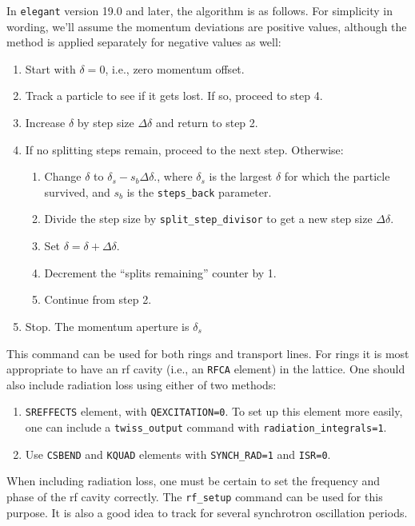 \documentclass[11pt]{article}
\begin{document}
In {\tt elegant} version 19.0 and later, the algorithm is as follows.  For simplicity in
wording, we'll assume the momentum deviations are positive values,
although the method is applied separately for negative values as well:
\begin{enumerate}
\item Start with $\delta=0$, i.e., zero momentum offset.
\item Track a particle to see if it gets lost.  If so, proceed to step 4.
\item Increase $\delta$ by step size $\Delta\delta$ and return to step 2.
\item If no splitting steps remain, proceed to the next step.  Otherwise:
\begin{enumerate}
\item Change $\delta$ to $\delta_s - s_b\Delta\delta$., where $\delta_s$ is
 the largest $\delta$ for which the particle survived, and $s_b$ is the
 \verb|steps_back| parameter.
\item Divide the step size by \verb|split_step_divisor| to get a new step size  $\Delta\delta$.
\item Set $\delta = \delta + \Delta\delta$.
\item Decrement the ``splits remaining'' counter by 1.
\item Continue from step 2.
\end{enumerate}
\item Stop.  The momentum aperture is $\delta_s$
\end{enumerate}

This command can be used for both rings and transport lines.  For
rings it is most appropriate to have an rf cavity (i.e., an {\tt RFCA}
element) in the lattice.  One should also include radiation loss using
either of two methods:
\begin{enumerate}
\item {\tt SREFFECTS} element, with {\tt QEXCITATION=0}.  To set up this element more easily, one
 can include a \verb|twiss_output| command with \verb|radiation_integrals=1|.
\item Use {\tt CSBEND} and {\tt KQUAD} elements with \verb|SYNCH_RAD=1| and \verb|ISR=0|.
\end{enumerate}
When including radiation loss, one must be certain to set the frequency and phase of the rf cavity
correctly.  The \verb|rf_setup| command can be used for this purpose.
It is also a good idea to track for several synchrotron oscillation periods.
\end{document}
